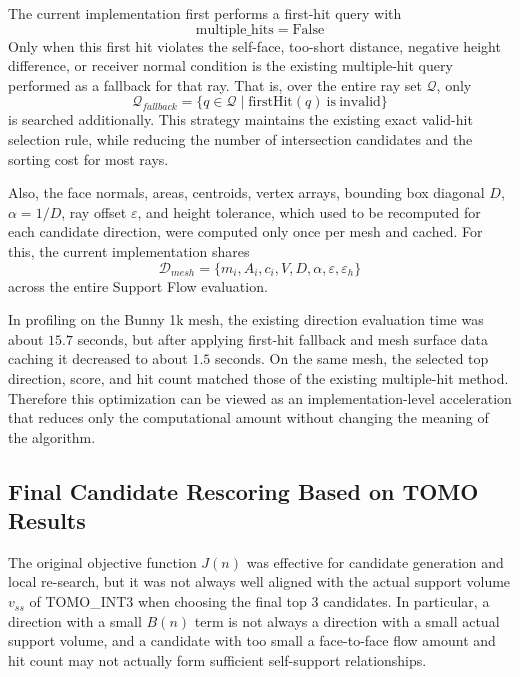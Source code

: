 \documentclass[11pt,a4paper]{article}
\begin{document}
The current implementation first performs a first-hit query with
\begin{equation}
\mathrm{multiple\_hits}=\mathrm{False}
\end{equation}
Only when this first hit violates the self-face, too-short distance, negative height difference, or receiver normal condition
is the existing multiple-hit query performed as a fallback for that ray.
That is, over the entire ray set $\mathcal{Q}$, only
\begin{equation}
\mathcal{Q}_{fallback}
=
\{q\in\mathcal{Q}\mid \mathrm{firstHit}(q)\ \mathrm{is\ invalid}\}
\end{equation}
is searched additionally.
This strategy maintains the existing exact valid-hit selection rule, while
reducing the number of intersection candidates and the sorting cost for most rays.

Also, the face normals, areas, centroids, vertex arrays,
bounding box diagonal $D$, $\alpha=1/D$, ray offset $\varepsilon$, and height tolerance, which used to be recomputed for each candidate direction,
were computed only once per mesh and cached.
For this, the current implementation shares
\begin{equation}
\mathcal{D}_{mesh}
=
\{m_i,A_i,c_i,V,D,\alpha,\varepsilon,\varepsilon_h\}
\end{equation}
across the entire Support Flow evaluation.

In profiling on the Bunny 1k mesh,
the existing direction evaluation time was about $15.7$ seconds, but
after applying first-hit fallback and mesh surface data caching it decreased to about $1.5$ seconds.
On the same mesh, the selected top direction, score, and hit count matched those of the existing multiple-hit method.
Therefore this optimization can be viewed as an implementation-level acceleration that reduces only the computational amount without changing the meaning of the algorithm.

\subsection{Final Candidate Rescoring Based on TOMO Results}

The original objective function $J(n)$ was effective for candidate generation and local re-search, but
it was not always well aligned with the actual support volume $v_{ss}$ of TOMO\_INT3 when choosing the final top 3 candidates.
In particular, a direction with a small $B(n)$ term is not always a direction with a small actual support volume,
and a candidate with too small a face-to-face flow amount and hit count may not actually form sufficient self-support relationships.
\end{document}
